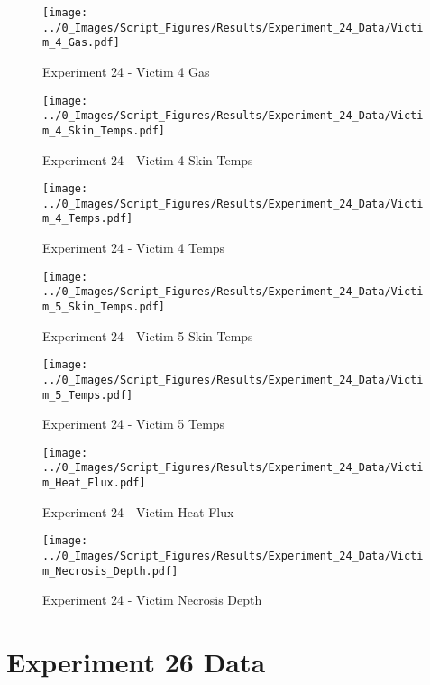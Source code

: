 	\clearpage

	\begin{figure}[H]
		\centering
		\texttt{[image: ../0\_Images/Script\_Figures/Results/Experiment\_24\_Data/Victim\_4\_Gas.pdf]}
		\caption[]{Experiment 24 - Victim 4 Gas}
	\end{figure}
 

	\begin{figure}[H]
		\centering
		\texttt{[image: ../0\_Images/Script\_Figures/Results/Experiment\_24\_Data/Victim\_4\_Skin\_Temps.pdf]}
		\caption[]{Experiment 24 - Victim 4 Skin Temps}
	\end{figure}
 
	\clearpage

	\begin{figure}[H]
		\centering
		\texttt{[image: ../0\_Images/Script\_Figures/Results/Experiment\_24\_Data/Victim\_4\_Temps.pdf]}
		\caption[]{Experiment 24 - Victim 4 Temps}
	\end{figure}
 

	\begin{figure}[H]
		\centering
		\texttt{[image: ../0\_Images/Script\_Figures/Results/Experiment\_24\_Data/Victim\_5\_Skin\_Temps.pdf]}
		\caption[]{Experiment 24 - Victim 5 Skin Temps}
	\end{figure}
 
	\clearpage

	\begin{figure}[H]
		\centering
		\texttt{[image: ../0\_Images/Script\_Figures/Results/Experiment\_24\_Data/Victim\_5\_Temps.pdf]}
		\caption[]{Experiment 24 - Victim 5 Temps}
	\end{figure}
 

	\begin{figure}[H]
		\centering
		\texttt{[image: ../0\_Images/Script\_Figures/Results/Experiment\_24\_Data/Victim\_Heat\_Flux.pdf]}
		\caption[]{Experiment 24 - Victim Heat Flux}
	\end{figure}
 
	\clearpage

	\begin{figure}[H]
		\centering
		\texttt{[image: ../0\_Images/Script\_Figures/Results/Experiment\_24\_Data/Victim\_Necrosis\_Depth.pdf]}
		\caption[]{Experiment 24 - Victim Necrosis Depth}
	\end{figure}
 

\clearpage		\large
\section{Experiment 26 Data} \label{App:Exp26Results} 

